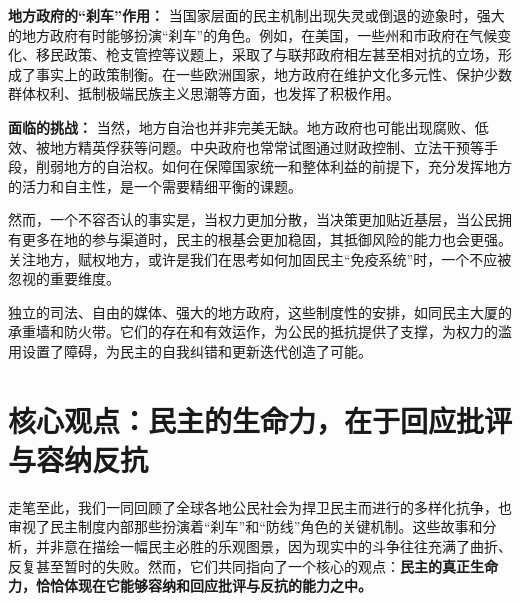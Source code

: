 \documentclass[UTF8, 10pt]{ctexbook}
\begin{document}
\textbf{地方政府的“刹车”作用：} 当国家层面的民主机制出现失灵或倒退的迹象时，强大的地方政府有时能够扮演“刹车”的角色。例如，在美国，一些州和市政府在气候变化、移民政策、枪支管控等议题上，采取了与联邦政府相左甚至相对抗的立场，形成了事实上的政策制衡。在一些欧洲国家，地方政府在维护文化多元性、保护少数群体权利、抵制极端民族主义思潮等方面，也发挥了积极作用。

\textbf{面临的挑战：} 当然，地方自治也并非完美无缺。地方政府也可能出现腐败、低效、被地方精英俘获等问题。中央政府也常常试图通过财政控制、立法干预等手段，削弱地方的自治权。如何在保障国家统一和整体利益的前提下，充分发挥地方的活力和自主性，是一个需要精细平衡的课题。

然而，一个不容否认的事实是，当权力更加分散，当决策更加贴近基层，当公民拥有更多在地的参与渠道时，民主的根基会更加稳固，其抵御风险的能力也会更强。关注地方，赋权地方，或许是我们在思考如何加固民主“免疫系统”时，一个不应被忽视的重要维度。

独立的司法、自由的媒体、强大的地方政府，这些制度性的安排，如同民主大厦的承重墙和防火带。它们的存在和有效运作，为公民的抵抗提供了支撑，为权力的滥用设置了障碍，为民主的自我纠错和更新迭代创造了可能。

\section{核心观点：民主的生命力，在于回应批评与容纳反抗}
\lettrine[lines=2]{走}{笔}至此，我们一同回顾了全球各地公民社会为捍卫民主而进行的多样化抗争，也审视了民主制度内部那些扮演着“刹车”和“防线”角色的关键机制。这些故事和分析，并非意在描绘一幅民主必胜的乐观图景，因为现实中的斗争往往充满了曲折、反复甚至暂时的失败。然而，它们共同指向了一个核心的观点：\textbf{民主的真正生命力，恰恰体现在它能够容纳和回应批评与反抗的能力之中。}
\end{document}
